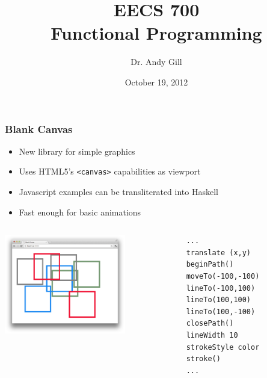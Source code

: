 \documentclass{beamer}
\title[EECS 700]{EECS 700\\Functional Programming}
\author[Andy Gill]{Dr. Andy Gill}
\institute{University of Kansas}
\date{October 19, 2012}
\begin{document}
\frame{\titlepage}

\begin{frame}[fragile]
\frametitle{Blank Canvas}
\Large
\begin{itemize}
\item New library for simple graphics
\item Uses HTML5's \verb|<canvas>| capabilities as viewport
\item Javascript examples can be transliterated into Haskell    
\item Fast enough for basic animations
\end{itemize}
\begin{columns}
\begin{column}{0.45\textwidth}
\includegraphics[width=150pt]{squares.png}
\end{column}
\begin{column}{0.55\textwidth}
\begin{codeblock}[0.6]
\footnotesize
\begin{verbatim}
...
translate (x,y)
beginPath()
moveTo(-100,-100)
lineTo(-100,100)
lineTo(100,100)
lineTo(100,-100)
closePath()
lineWidth 10
strokeStyle color
stroke()
...
\end{verbatim}
\end{codeblock}
\end{column}
\end{columns}


\end{frame}
\end{document}
